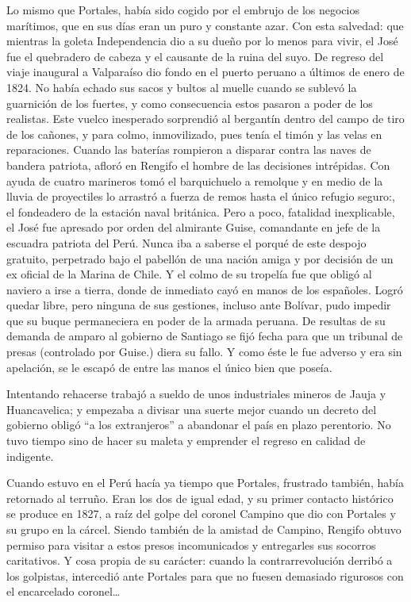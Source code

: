 \documentclass[10pt,twoside,openright]{memoir}
\begin{document}
Lo mismo que Portales, había sido cogido por el embrujo de los negocios
marítimos, que en sus días eran un puro y constante azar. Con esta
salvedad: que mientras la goleta Independencia dio a su dueño por lo
menos para vivir, el José fue el quebradero de cabeza y el causante de
la ruina del suyo. De regreso del viaje inaugural a Valparaíso dio fondo
en el puerto peruano a últimos de enero de 1824. No había echado sus
sacos y bultos al muelle cuando se sublevó la guarnición de los fuertes,
y como consecuencia estos pasaron a poder de los realistas. Este vuelco
inesperado sorprendió al bergantín dentro del campo de tiro de los
cañones, y para colmo, inmovilizado, pues tenía el timón y las velas en
reparaciones. Cuando las baterías rompieron a disparar contra las naves
de bandera patriota, afloró en Rengifo el hombre de las decisiones
intrépidas. Con ayuda de cuatro marineros tomó el barquichuelo a
remolque y en medio de la lluvia de proyectiles lo arrastró a fuerza de
remos hasta el único refugio seguro:, el fondeadero de la estación naval
británica. Pero a poco, fatalidad inexplicable, el José fue apresado por
orden del almirante Guise, comandante en jefe de la escuadra patriota
del Perú. Nunca iba a saberse el porqué de este despojo gratuito,
perpetrado bajo el pabellón de una nación amiga y por decisión de un ex
oficial de la Marina de Chile. Y el colmo de su tropelía fue que obligó
al naviero a irse a tierra, donde de inmediato cayó en manos de los
españoles. Logró quedar libre, pero ninguna de sus gestiones, incluso
ante Bolívar, pudo impedir que su buque permaneciera en poder de la
armada peruana. De resultas de su demanda de amparo al gobierno de
Santiago se fijó fecha para que un tribunal de presas (controlado por
Guise.) diera su fallo. Y como éste le fue adverso y era sin apelación,
se le escapó de entre las manos el único bien que poseía.

Intentando rehacerse trabajó a sueldo de unos industriales mineros de
Jauja y Huancavelica; y empezaba a divisar una suerte mejor cuando un
decreto del gobierno obligó ``a los extranjeros'' a abandonar el país en
plazo perentorio. No tuvo tiempo sino de hacer su maleta y emprender el
regreso en calidad de indigente.

Cuando estuvo en el Perú hacía ya tiempo que Portales, frustrado
también, había retornado al terruño. Eran los dos de igual edad, y su
primer contacto histórico se produce en 1827, a raíz del golpe del
coronel Campino que dio con Portales y su grupo en la cárcel. Siendo
también de la amistad de Campino, Rengifo obtuvo permiso para visitar a
estos presos incomunicados y entregarles sus socorros caritativos. Y
cosa propia de su carácter: cuando la contrarrevolución derribó a los
golpistas, intercedió ante Portales para que no fuesen demasiado
rigurosos con el encarcelado coronel\ldots
\end{document}
